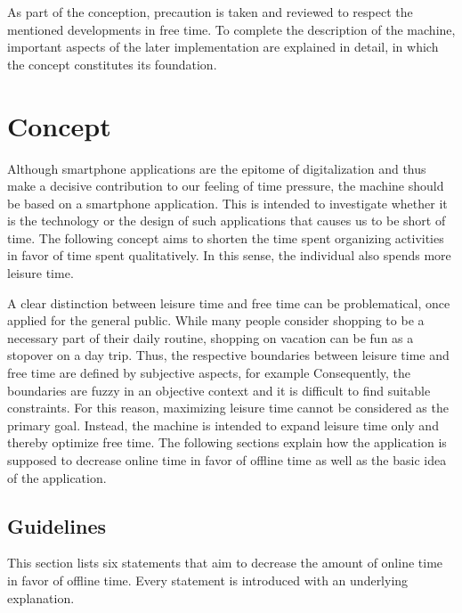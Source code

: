 \documentclass[12pt,numbers=noenddot,parskip,bibliography=totocnumbered,listof=totocnumbered,draft]{scrreprt}
\begin{document}
As part of the conception, precaution is taken and reviewed to respect the mentioned developments in free time. To complete the description of the machine, important aspects of the later implementation are explained in detail, in which the concept constitutes its foundation.

\section{Concept}
Although smartphone applications are the epitome of digitalization and thus make a decisive contribution to our feeling of time pressure, the machine should be based on a smartphone application. This is intended to investigate whether it is the technology or the design of such applications that causes us to be short of time. The following concept aims to shorten the time spent organizing activities in favor of time spent qualitatively. In this sense, the individual also spends more leisure time. 

A clear distinction between leisure time and free time can be problematical, once applied for the general public. While many people consider shopping to be a necessary part of their daily routine, shopping on vacation can be fun as a stopover on a day trip. Thus, the respective boundaries between leisure time and free time are defined by subjective aspects, for example  Consequently, the boundaries are fuzzy in an objective context and it is difficult to find suitable constraints. For this reason, maximizing leisure time cannot be considered as the primary goal. Instead, the machine is intended to expand leisure time only and thereby optimize free time. The following sections explain how the application is supposed to decrease online time in favor of offline time as well as the basic idea of the application.

\subsection{Guidelines}
This section lists six statements that aim to decrease the amount of online time in favor of offline time. Every statement is introduced with an underlying explanation.
\end{document}
